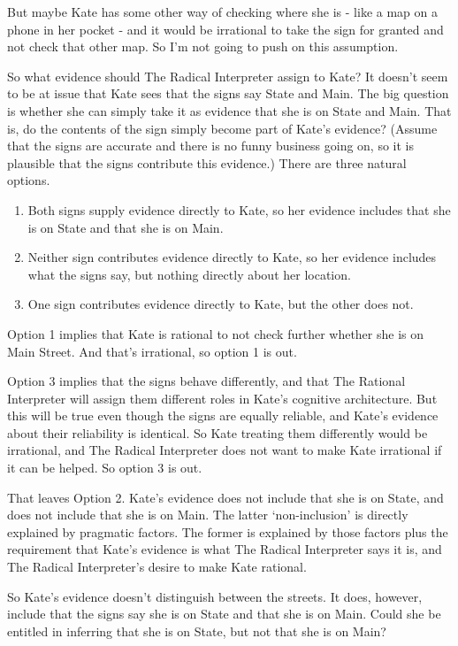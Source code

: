 \documentclass[
  10pt,
  letterpaper,
  twoside]{scrbook}
\providecommand{\tightlist}{%
  \setlength{\itemsep}{0pt}\setlength{\parskip}{0pt}}\usepackage{longtable,booktabs,array}
\begin{document}
But maybe Kate has some other way of checking where she is - like a map
on a phone in her pocket - and it would be irrational to take the sign
for granted and not check that other map. So I'm not going to push on
this assumption.

So what evidence should The Radical Interpreter assign to Kate? It
doesn't seem to be at issue that Kate sees that the signs say State and
Main. The big question is whether she can simply take it as evidence
that she is on State and Main. That is, do the contents of the sign
simply become part of Kate's evidence? (Assume that the signs are
accurate and there is no funny business going on, so it is plausible
that the signs contribute this evidence.) There are three natural
options.

\begin{enumerate}
\def\labelenumi{\arabic{enumi}.}
\tightlist
\item
  Both signs supply evidence directly to Kate, so her evidence includes
  that she is on State and that she is on Main.
\item
  Neither sign contributes evidence directly to Kate, so her evidence
  includes what the signs say, but nothing directly about her location.
\item
  One sign contributes evidence directly to Kate, but the other does
  not.
\end{enumerate}

Option 1 implies that Kate is rational to not check further whether she
is on Main Street. And that's irrational, so option 1 is out.

Option 3 implies that the signs behave differently, and that The
Rational Interpreter will assign them different roles in Kate's
cognitive architecture. But this will be true even though the signs are
equally reliable, and Kate's evidence about their reliability is
identical. So Kate treating them differently would be irrational, and
The Radical Interpreter does not want to make Kate irrational if it can
be helped. So option 3 is out.

That leaves Option 2. Kate's evidence does not include that she is on
State, and does not include that she is on Main. The latter
`non-inclusion' is directly explained by pragmatic factors. The former
is explained by those factors plus the requirement that Kate's evidence
is what The Radical Interpreter says it is, and The Radical
Interpreter's desire to make Kate rational.

So Kate's evidence doesn't distinguish between the streets. It does,
however, include that the signs say she is on State and that she is on
Main. Could she be entitled in inferring that she is on State, but not
that she is on Main?
\end{document}
